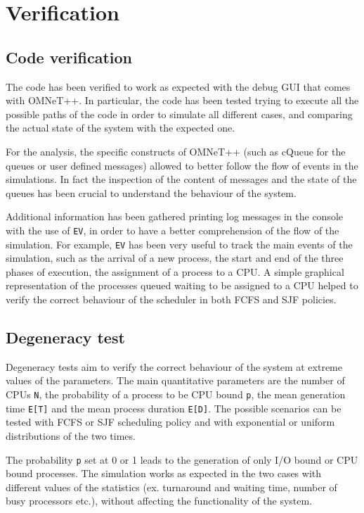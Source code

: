 \chapter{Verification}

\section{Code verification}
The code has been verified to work as expected with the debug GUI that comes 
with OMNeT++. In particular, the code has been tested trying to execute all the 
possible paths of the code in order to simulate all different cases, and comparing 
the actual state of the system with the expected one.

For the analysis, the specific constructs of OMNeT++ (such as cQueue for the queues 
or user defined messages) allowed to better follow the flow of events in the simulations.
In fact the inspection of the content of messages and the state of the queues has been 
crucial to understand the behaviour of the system.

Additional information has been gathered printing log messages in the console with the 
use of \texttt{EV}, in order to have a better comprehension of the flow of the simulation.
For example, \texttt{EV} has been very useful to track the main events of the 
simulation, such as the arrival of a new process, the start and end of the three phases 
of execution, the assignment of a process to a CPU. 
A simple graphical representation of the processes queued waiting to be assigned to a 
CPU helped to verify the correct behaviour of the scheduler in both FCFS and SJF policies.

\section{Degeneracy test}
Degeneracy tests aim to verify the correct behaviour of the system at extreme 
values of the parameters. The main quantitative parameters are the number of CPUs 
\texttt{N}, the probability of a process to be CPU bound \texttt{p}, the mean generation time
\texttt{E[T]} and the mean process duration \texttt{E[D]}. The possible scenarios
can be tested with FCFS or SJF scheduling policy and with exponential or uniform 
distributions of the two times.

The probability \texttt{p} set at 0 or 1 leads to the generation of
only I/O bound or CPU bound processes. The simulation works as expected in the 
two cases with different values of the statistics (ex. turnaround and waiting time, 
number of busy processors etc.), without affecting the functionality of the system.

